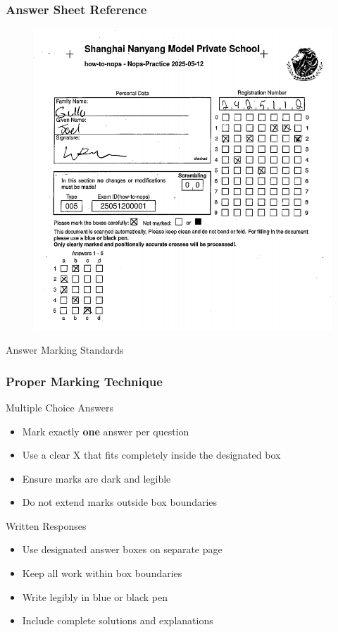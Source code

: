 \documentclass{beamer}
\begin{document}
\begin{frame}
\frametitle{Answer Sheet Reference}
\begin{figure}
    \centering
    \includegraphics[width=0.5\linewidth]{scannops.png}
\end{figure}
\end{frame}

\begin{frame}{Answer Marking Standards}
\frametitle{Proper Marking Technique}
\begin{block}{Multiple Choice Answers}
\begin{itemize}
\item Mark exactly \textbf{one} answer per question
\item Use a clear X that fits completely inside the designated box
\item Ensure marks are dark and legible
\item Do not extend marks outside box boundaries
\end{itemize}
\end{block}

\begin{block}{Written Responses}
\begin{itemize}
\item Use designated answer boxes on separate page
\item Keep all work within box boundaries
\item Write legibly in blue or black pen
\item Include complete solutions and explanations
\end{itemize}
\end{block}
\end{frame}
\end{document}
